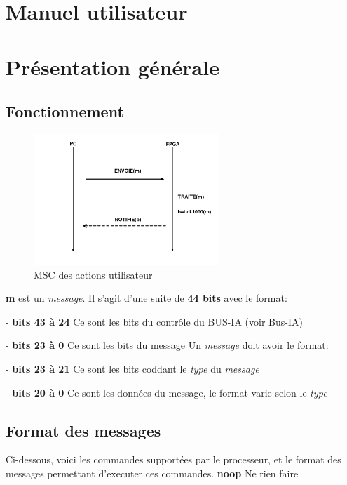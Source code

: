 \documentclass[10pt]{article}
\begin{document}
    \newpage
    \section{Manuel utilisateur}
    
    \newpage
    \section{Présentation générale}
    
        \subsection{Fonctionnement}
        \begin{figure}[h!]
            \includegraphics[width=7cm]{fonctionnement.png}
            \caption{MSC des actions utilisateur}
        \end{figure}
        
        \textbf{m} est un \textit{message}. Il s'agit d'une suite de \textbf{44 bits} avec le format:
        
        - \textbf{bits 43 à 24} Ce sont les bits du contrôle du BUS-IA (voir Bus-IA)
        
        - \textbf{bits 23 à 0} Ce sont les bits du message
        \newline
        \newline
        Un \textit{message} doit avoir le format:
        
        - \textbf{bits 23 à 21} Ce sont les bits coddant le \textit{type} du \textit{message}
        
        - \textbf{bits 20 à 0} Ce sont les données du message, le format varie selon le \textit{type}
        
        \subsection{Format des messages}
        
        Ci-dessous, voici les commandes supportées par le processeur,
        et le format des messages permettant d'executer ces commandes.
        \newline
        \newline
        \textbf{noop} Ne rien faire
        
\end{document}
